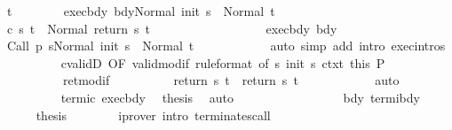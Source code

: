 \begin{isabellebody}
\ t\isanewline
\ \ \ \ \ \ \isamarkupfalse%
\ exec{\isacharunderscore}bdy{\isacharcolon}\ {\isachardoublequoteopen}{\isasymGamma}{\isasymturnstile}{\isasymlangle}bdy{\isacharcomma}Normal\ {\isacharparenleft}init\ s{\isacharparenright}{\isasymrangle}\ {\isasymRightarrow}\ Normal\ t{\isachardoublequoteclose}\isanewline
\ \ \ \ \ \ \isamarkupfalse%
\ {\isachardoublequoteopen}{\isasymGamma}{\isasymturnstile}c\ s\ t\ {\isasymdown}\ Normal\ {\isacharparenleft}return\ s\ t{\isacharparenright}{\isachardoublequoteclose}\isanewline
\ \ \ \ \ \ \isamarkupfalse%
\ {\isacharminus}\isanewline
\ \ \ \ \ \ \ \ \isamarkupfalse%
\ exec{\isacharunderscore}bdy\ bdy\isanewline
\ \ \ \ \ \ \ \ \isamarkupfalse%
\ {\isachardoublequoteopen}{\isasymGamma}{\isasymturnstile}{\isasymlangle}Call\ {\isacharparenleft}p\ s{\isacharparenright}{\isacharcomma}Normal\ {\isacharparenleft}init\ s{\isacharparenright}{\isasymrangle}\ {\isasymRightarrow}\ Normal\ t{\isachardoublequoteclose}\isanewline
\ \ \ \ \ \ \ \ \ \ \isamarkupfalse%
\ {\isacharparenleft}auto\ simp\ add{\isacharcolon}\ intro{\isacharcolon}\ exec{\isachardot}intros{\isacharparenright}\isanewline
\ \ \ \ \ \ \ \ \isamarkupfalse%
\ cvalidD\ {\isacharbrackleft}OF\ valid{\isacharunderscore}modif\ {\isacharbrackleft}rule{\isacharunderscore}format{\isacharcomma}\ of\ s\ {\isachardoublequoteopen}init\ s{\isachardoublequoteclose}{\isacharbrackright}\ ctxt{\isacharprime}\ this{\isacharbrackright}\ P\ \isanewline
\ \ \ \ \ \ \ \ \ \ ret{\isacharunderscore}modif\isanewline
\ \ \ \ \ \ \ \ \isamarkupfalse%
\ {\isachardoublequoteopen}return{\isacharprime}\ s\ t\ {\isacharequal}\ return\ s\ t{\isachardoublequoteclose}\isanewline
\ \ \ \ \ \ \ \ \ \ \isamarkupfalse%
\ auto\isanewline
\ \ \ \ \ \ \ \ \isamarkupfalse%
\ termi{\isacharunderscore}c\ exec{\isacharunderscore}bdy\ \isamarkupfalse%
\ {\isacharquery}thesis\ \isamarkupfalse%
\ auto\isanewline
\ \ \ \ \ \ \isamarkupfalse%
\isanewline
\ \ \ \ \isacommand{{\isacharbraceright}}\isamarkupfalse%
\isanewline
\ \ \ \ \isamarkupfalse%
\ bdy\ termi{\isacharunderscore}bdy\isanewline
\ \ \ \ \isamarkupfalse%
\ {\isacharquery}thesis\isanewline
\ \ \ \ \ \ \isamarkupfalse%
\ {\isacharparenleft}iprover\ intro{\isacharcolon}\ terminates{\isacharunderscore}call{\isacharparenright}\isanewline
\ \ \isamarkupfalse%
\isanewline

\end{isabellebody}

